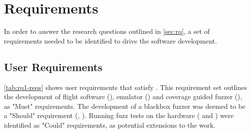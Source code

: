 \documentclass[../report.tex]{subfiles}
\begin{document}
\section{Requirements}

In order to answer the research questions outlined in \autoref{sec:rq}, a set
of requirements needed to be identified to drive the software development.

\subsection{User Requirements} \label{sec:user-req}

\autoref{tab:rq1-reqs} shows user requirements that satisfy . This
requirement set outlines the development of flight software (),
emulator () and coverage guided fuzzer (), as
"Must" requirements. The development of a blackbox fuzzer was deemed to be a
"Should" requirement (, ). Running fuzz tests on
the hardware ( and ) were identified as "Could"
requirements, as potential extensions to the work.
\end{document}
